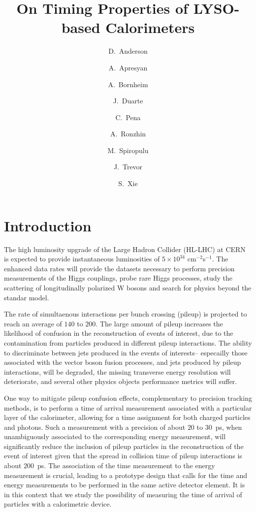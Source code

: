 \documentclass[12pt]{article}
\title{On Timing Properties of LYSO-based Calorimeters}
\author[1]{D.~Anderson}
\author[1]{A.~Apresyan}
\author[1]{A.~Bornheim}
\author[1]{J.~Duarte}
\author[1]{C.~Pena}
\author[2]{A.~Ronzhin}
\author[1]{M.~Spiropulu}
\author[1]{J.~Trevor}
\author[1]{S.~Xie}
\affil[1]{California Institute of Technology, Pasadena, CA, USA}
\affil[2]{Fermi National Accelerator Laboratory, Batavia, IL, USA}
\date{}
\begin{document}
\maketitle
{}



\section{Introduction}

The high luminosity upgrade of the Large Hadron Collider (HL-LHC) at
CERN~\cite{Rossi:1471000} is expected to provide instantaneous luminosities of
$5\times10^{34}$ cm$^{-2}$s$^{-1}$. The enhanced data rates will
provide the datasets necessary to perform precision measurements of the Higgs couplings, 
probe rare Higgs processes, study the scattering of longitudinally polarized W
bosons and search for physics beyond the standar model. 

The  rate of simultaenous 
interactions per bunch crossing (pileup) is  projected to reach an average of $140$ to $200$. 
The large amount of pileup increases the likelihood  of confusion in the reconstruction of events of 
interest, due to the contamination from particles produced in different pileup interactions. 
The ability to discriminate between jets produced in the events of interests-- especailly those associated with the vector boson fusion processes, and jets produced by pileup interactions, will be degraded, 
the missing transverse energy resolution will deteriorate, and several other physics objects performance metrics will suffer.


One way to mitigate pileup confusion effects, complementary to precision tracking methods, 
is to perform a time of arrival measurement associated with a particular layer of the calorimeter, 
allowing for a time assignment for both charged particles and photons. Such a measurement with a precision of about
$20$ to $30$~ps, when unambiguously associated to the corresponding energy
measurement, will significantly reduce the inclusion of pileup particles in  the
reconstruction of the event of interest given that the spread in collision time of
pileup interactions is about $200$~ps. The association of  the time measurement to the energy 
measurement is crucial,  leading to  a  prototype  design that calls for the time and energy measurements to be performed  
in the same active detector element. It is in this context that we study the possibility of measuring the
time of arrival of particles with a calorimetric device.
\end{document}

